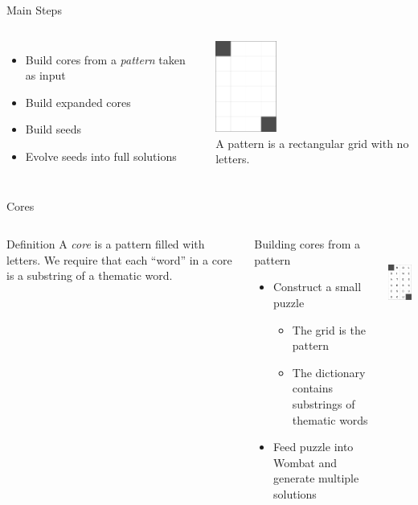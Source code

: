 \documentclass[aspectratio=169,usenames,dvipsnames]{beamer}
\newcommand{\bei}{\begin{itemize}}
\newcommand{\eei}{\end{itemize}}
\newcommand{\ie}{\item}
\numberwithin{equation}{section}
\numberwithin{theorem}{section}
\numberwithin{lem}{section}
\numberwithin{df}{section}
\begin{document}
\begin{frame}{Main Steps}

\begin{columns}
\bei
\ie Build cores from a \emph{pattern} taken as input
\ie Build expanded cores
\ie Build seeds
\ie Evolve seeds into full solutions
\eei
{}
\centering
\includegraphics[height=3cm]{_plots/6x4-puzzle.png}\\
A pattern is a rectangular grid with no letters.
\end{columns}

\end{frame}


\begin{frame}{Cores}

\begin{columns}
\begin{block}{Definition}
A \emph{core} is a pattern filled with letters. We require that each ``word'' in a core is a substring of a thematic word.
\end{block}
\begin{block}{Building cores from a pattern}
\bei
\ie Construct a small puzzle
\bei 
\ie The grid is the pattern
\ie The dictionary contains substrings of thematic words
\eei
\ie Feed puzzle into {\sc Wombat} and generate multiple solutions
\eei
\end{block}
\centering
\includegraphics[height=3cm]{_plots/core-6x4-puzzle.png}
\end{columns}

\end{frame}
\end{document}
